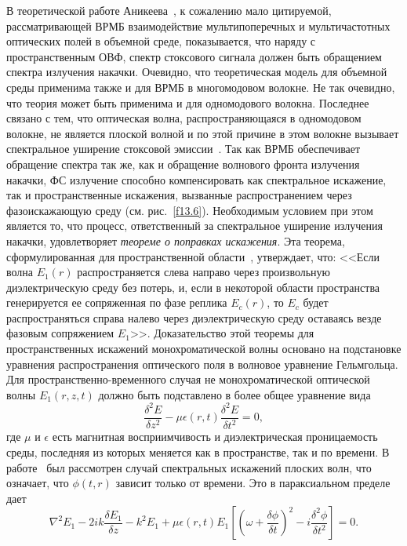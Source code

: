 В теоретической работе Аникеева~\cite{1339}, к сожалению мало
цитируемой, рассматривающей ВРМБ взаимодействие мультипоперечных и
мультичастотных оптических полей в объемной среде, показывается, что
наряду с пространственным ОВФ, спектр стоксового сигнала должен быть
обращением спектра излучения накачки. Очевидно, что теоретическая
модель для объемной среды применима также и для ВРМБ в многомодовом
волокне. Не так очевидно, что теория может быть применима и для
одномодового волокна. Последнее связано с тем, что оптическая волна,
распространяющаяся в одномодовом волокне, не является плоской волной
и по этой причине в этом волокне вызывает спектральное уширение
стоксовой эмиссии~\cite{1326}. Так как ВРМБ обеспечивает обращение
спектра так же, как и обращение волнового фронта излучения накачки,
ФС излучение способно компенсировать как спектральное искажение, так
и пространственные искажения, вызванные распространением через
фазоискажающую среду (см. рис.~\ref{f13.6}). Необходимым условием
при этом является то, что процесс, ответственный за спектральное
уширение излучения накачки, удовлетворяет \emph{теореме о поправках
искажения}. Эта теорема, сформулированная для пространственной
области~\cite{1340}, утверждает, что: <<Если волна $E_1(r)$
распространяется слева направо через произвольную диэлектрическую
среду без потерь, и, если в некоторой области пространства
генерируется ее сопряженная по фазе реплика $E_c(r)$, то $E_c$ будет
распространяться справа налево через диэлектрическую среду оставаясь
везде фазовым сопряжением $E_1$>>. Доказательство этой теоремы
для пространственных искажений монохроматической волны основано на
подстановке уравнения распространения оптического поля в волновое
уравнение Гельмгольца. Для пространственно-временного случая не
монохроматической оптической волны $E_1(r,z,t)$ должно быть
подставлено в более общее уравнение вида
\begin{equation}\label{eq13.4}
    \frac{\delta^{2}E}{\delta z^2} - \mu \epsilon(r,t) \frac{\delta^{2}E}{\delta
    t^2} = 0,
\end{equation}
где $\mu$ и $\epsilon$ есть магнитная восприимчивость и
диэлектрическая проницаемость среды, последняя из которых меняется
как в пространстве, так и по времени. В работе~\cite{1300} был
рассмотрен случай спектральных искажений плоских волн, что означает,
что $\phi(t,r)$ зависит только от времени. Это в параксиальном
пределе дает
\begin{equation}\label{eq13.5}
    \nabla^{2}E_1 - 2ik \frac{\delta E_1}{\delta z} - k^2 E_1 + \mu
    \epsilon(r,t) E_1 \left[ \left(\omega + \frac{\delta \phi}{\delta t}\right)^2 -i \frac{\delta^{2}\phi}{\delta
    t^2}\right] = 0.
\end{equation}
